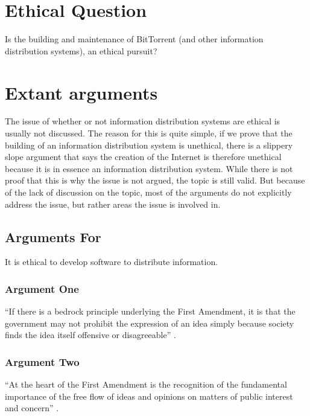 \documentclass[11pt]{article}
\begin{document}
\section{Ethical Question}

Is the building and maintenance of BitTorrent (and other information distribution systems), an ethical pursuit?

\section{Extant arguments}

The issue of whether or not information distribution systems are ethical is usually not discussed. The reason for this is quite simple, if we prove that the building of an information distribution system is unethical, there is a slippery slope argument that says the creation of the Internet is therefore unethical because it is in essence an information distribution system. While there is not proof that this is why the issue is not argued, the topic is still valid. But because of the lack of discussion on the topic, most of the arguments do not explicitly address the issue, but rather areas the issue is involved in.

\subsection{Arguments For}

It is ethical to develop software to distribute information.

\subsubsection{Argument One}
``If there is a bedrock principle underlying the First Amendment, it is that the government may not prohibit the expression of an idea simply because society finds the idea itself offensive or disagreeable'' \cite[414]{1989texas}.

\subsubsection{Argument Two}
``At the heart of the First Amendment is the recognition of the fundamental importance of the free flow of ideas and opinions on matters of public interest and concern'' \cite[51]{1988hustler}.
\end{document}
